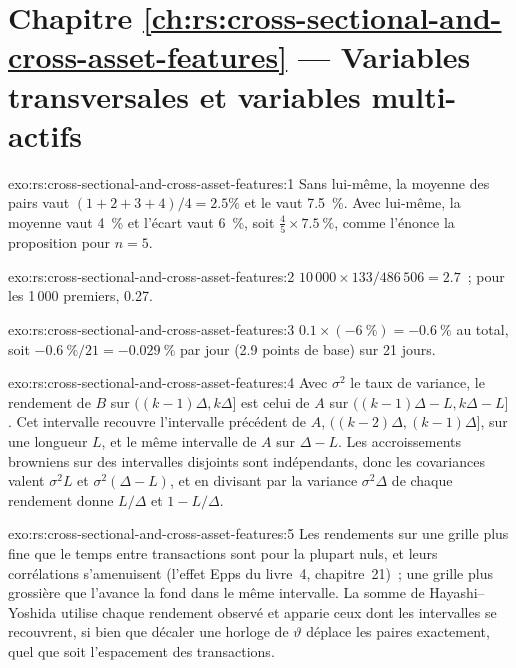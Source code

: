 \section*{Chapitre \ref{ch:rs:cross-sectional-and-cross-asset-features} --- Variables transversales et variables multi-actifs}

\begin{solution}{exo:rs:cross-sectional-and-cross-asset-features:1}
Sans lui-même, la moyenne des pairs vaut $(1 + 2 + 3 + 4)/4 = 2.5\%$ et le  vaut 7.5~\%. Avec lui-même, la moyenne vaut 4~\% et
l'écart vaut 6~\%, soit $\frac45 \times 7.5~\%$, comme l'énonce la proposition pour $n = 5$.
\end{solution}

\begin{solution}{exo:rs:cross-sectional-and-cross-asset-features:2}
$10\,000 \times 133/486\,506 = 2.7$~; pour les 1\,000 premiers, 0.27.
\end{solution}

\begin{solution}{exo:rs:cross-sectional-and-cross-asset-features:3}
$0.1 \times (-6~\%) = -0.6~\%$ au total, soit $-0.6~\%/21 = -0.029~\%$ par jour (2.9 points de base) sur 21 jours.
\end{solution}

\begin{solution}{exo:rs:cross-sectional-and-cross-asset-features:4}
Avec $\sigma^2$ le taux de variance, le rendement de $B$ sur $((k-1)\Delta, k\Delta]$ est celui de $A$ sur $((k-1)\Delta - L, k\Delta - L]$. Cet intervalle
recouvre l'intervalle précédent de $A$, $((k-2)\Delta, (k-1)\Delta]$, sur une longueur $L$, et le même intervalle de $A$ sur $\Delta - L$. Les accroissements browniens
sur des intervalles disjoints sont indépendants, donc les covariances valent $\sigma^2 L$ et $\sigma^2(\Delta - L)$, et en divisant par la variance
$\sigma^2\Delta$ de chaque rendement donne $L/\Delta$ et $1 - L/\Delta$.
\end{solution}

\begin{solution}{exo:rs:cross-sectional-and-cross-asset-features:5}
Les rendements sur une grille plus fine que le temps entre transactions sont pour la plupart nuls, et leurs corrélations s'amenuisent (l'effet Epps du livre~4,
chapitre~21)~; une grille plus grossière que l'avance la fond dans le même intervalle. La somme de Hayashi--Yoshida utilise chaque rendement observé et
apparie ceux dont les intervalles se recouvrent, si bien que décaler une horloge de $\vartheta$ déplace les paires exactement, quel que soit l'espacement des transactions.
\end{solution}

